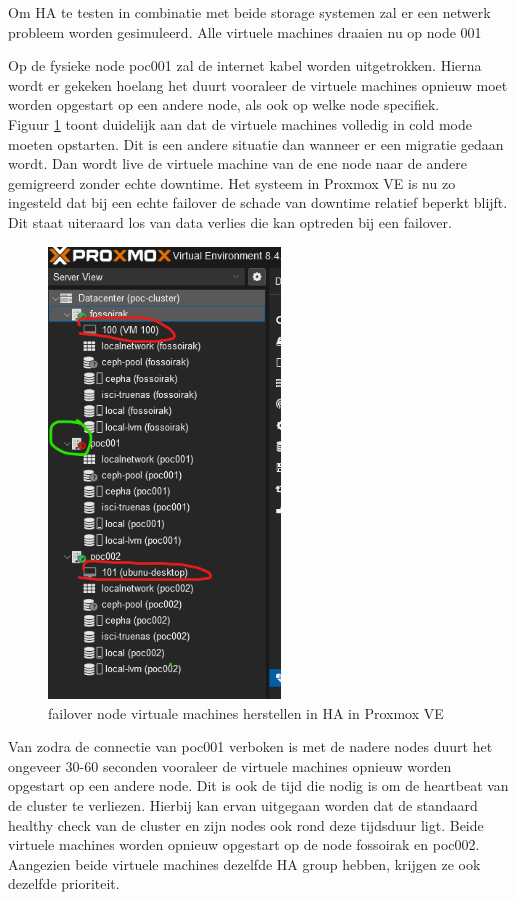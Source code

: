 Om HA te testen in combinatie met beide storage systemen zal er een netwerk probleem worden gesimuleerd.
Alle virtuele machines draaien nu op node 001

Op de fysieke node poc001 zal de internet kabel worden uitgetrokken. Hierna wordt er gekeken hoelang het duurt vooraleer de virtuele machines opnieuw moet worden opgestart op een andere node, als ook op welke node specifiek. \\
Figuur \ref{fig:failover-vm} toont duidelijk aan dat de virtuele machines volledig in cold mode moeten opstarten. Dit is een andere situatie dan wanneer er een migratie gedaan wordt.
Dan wordt live de virtuele machine van de ene node naar de andere gemigreerd zonder echte downtime.
Het systeem in Proxmox VE is nu zo ingesteld dat bij een echte failover de schade van downtime relatief beperkt blijft. Dit staat uiteraard los van data verlies die kan optreden bij een failover.
\begin{figure}[H]
  \centering
  \includegraphics[width=0.55\textwidth]{../poc/failover-prox.png}
  \caption{failover node virtuale machines herstellen in HA in Proxmox VE}
  \label{fig:failover-vm}
\end{figure}

Van zodra de connectie van poc001 verboken is met de nadere nodes duurt het ongeveer 30-60 seconden vooraleer de virtuele machines opnieuw worden opgestart op een andere node. Dit is ook de tijd die nodig is om de heartbeat van de cluster te verliezen.
Hierbij kan ervan uitgegaan worden dat de standaard healthy check van de cluster en zijn nodes ook rond deze tijdsduur ligt. Beide virtuele machines worden opnieuw opgestart op de node fossoirak en poc002. \\
Aangezien beide virtuele machines dezelfde HA group hebben, krijgen ze ook dezelfde prioriteit.


